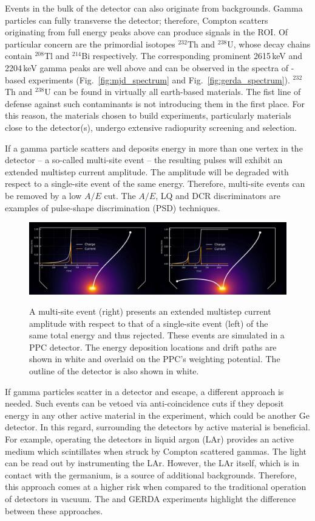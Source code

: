 Events in the bulk of the detector can also originate from backgrounds. Gamma particles can fully transverse the detector; therefore, Compton scatters originating from full energy peaks above \Qbb{} can produce signals in the ROI. Of particular concern are the primordial isotopes $^{232}$Th and $^{238}$U, whose decay chains contain $^{208}$Tl and $^{214}$Bi respectively. The corresponding prominent 2615\,keV and 2204\,keV gamma peaks are well above \Qbb{} and can be observed in the spectra of \geEn{}-based experiments (Fig.~\ref{fig:mjd_spectrum} and Fig.~\ref{fig:gerda_spectrum}). $^{232}$Th and $^{238}$U can be found in virtually all earth-based materials. The fist line of defense against such contaminants is not introducing them in the first place. For this reason, the materials chosen to build \novbb{} experiments, particularly materials close to the detector(s), undergo extensive radiopurity screening and selection.

If a gamma particle scatters and deposits energy in more than one vertex in the detector -- a so-called multi-site event -- the resulting pulses will exhibit an extended multistep current amplitude. The amplitude will be degraded with respect to a single-site event of the same energy. Therefore, multi-site events can be removed by a low $A/E$ cut. The $A/E$, LQ and DCR discriminators are examples of pulse-shape discrimination (PSD) techniques.
\begin{figure}[htb]
	\centering
	\includegraphics[width=6in]{figs/0vbb/sse_mse.pdf}
	\label{fig:mse}
	\caption{A multi-site event (right) presents an extended multistep current amplitude with respect to that of a single-site event (left) of the same total energy and thus rejected. These events are simulated in a PPC detector. The energy deposition locations and drift paths are shown in white and overlaid on the PPC's weighting potential. The outline of the detector is also shown in white.} 
\end{figure}

If gamma particles scatter in a detector and escape, a different approach is needed. Such events can be vetoed via anti-coincidence cuts if they deposit energy in any other active material in the experiment, which could be another Ge detector. In this regard, surrounding the detectors by active material is beneficial. For example, operating the detectors in liquid argon (LAr) provides an active medium which scintillates when struck by Compton scattered gammas. The light can be read out by instrumenting the LAr. However, the LAr itself, which is in contact with the germanium, is a source of additional backgrounds. Therefore, this approach comes at a higher risk when compared to the traditional operation of detectors in vacuum. The {\MJDEMit} and GERDA experiments highlight the difference between these approaches.

